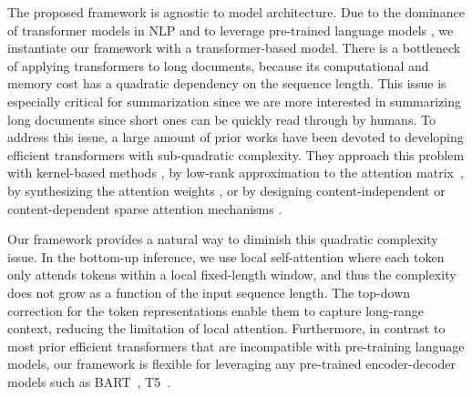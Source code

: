 The proposed framework is agnostic to model architecture. Due to the dominance of transformer models in NLP \citep{chen-etal-2018-best, zhang2020pegasus, sun-etal-2019-utilizing, martin-etal-2020-camembert} and to leverage pre-trained language models \citep{Liu2019RoBERTaAR, lewis-etal-2020-bart}, we instantiate our framework with a transformer-based model. There is a bottleneck of applying transformers to long documents, because its computational and memory cost has a quadratic dependency on the sequence length. This issue is especially critical for summarization since we are more interested in summarizing long documents since short ones can be quickly read through by humans. To address this issue, a large amount of prior works have been devoted to developing efficient transformers with sub-quadratic complexity. They approach this problem with kernel-based methods \citep{katharopoulos_et_al_2020, choromanski2020rethinking}, by low-rank approximation to the attention matrix~\citep{wang2020linformer}, by synthesizing the attention weights \citep{tay2021synthesizer}, or by designing content-independent \citep{Child2019GeneratingLS, beltagy2020longformer, ainslie-etal-2020-etc, zaheer2020big} or content-dependent sparse attention mechanisms \citep{kitaev2020reformer, roy-etal-2021-efficient, wang-etal-2021-cluster}.  

Our framework provides a natural way to diminish this quadratic complexity issue. In the bottom-up inference, we use local self-attention where each token only attends tokens within a local fixed-length window, and thus the complexity does not grow as a function of the input sequence length. The top-down correction for the token representations enable them to capture long-range context, reducing the limitation of local attention. Furthermore, in contrast to most prior efficient transformers that are incompatible with pre-training language models, our framework is flexible for leveraging any pre-trained encoder-decoder models such as BART~\citep{lewis-etal-2020-bart}, T5~\citep{raffel2020exploring}. 

